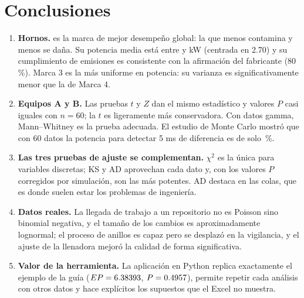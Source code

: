 \documentclass[11pt]{article}
\begin{document}
\section*{Conclusiones}
\begin{enumerate}
\item \textbf{Hornos.} \mejor{} es la marca de mejor desempeño global: la que menos contamina y menos se daña. Su
potencia media está entre \muLi{} y \muLs{} kW (centrada en 2.70) y su cumplimiento de emisiones es consistente con
la afirmación del fabricante (80\,\%). Marca 3 es la más uniforme en potencia: su varianza es significativamente
menor que la de Marca 4.
\item \textbf{Equipos A y B.} Las pruebas $t$ y $Z$ dan el mismo estadístico y valores $P$ casi iguales con $n=60$; la
$t$ es ligeramente más conservadora. Con datos gamma, Mann–Whitney es la prueba adecuada. El estudio de Monte Carlo
mostró que con 60 datos la potencia para detectar 5 ms de diferencia es de solo \mcTUno\,\%.
\item \textbf{Las tres pruebas de ajuste se complementan.} $\chi^2$ es la única para variables discretas; KS y AD
aprovechan cada dato y, con los valores $P$ corregidos por simulación, son las más potentes. AD destaca en las
colas, que es donde suelen estar los problemas de ingeniería.
\item \textbf{Datos reales.} La llegada de trabajo a un repositorio no es Poisson sino binomial negativa, y el tamaño
de los cambios es aproximadamente lognormal; el proceso de anillos es capaz pero se desplazó en la vigilancia, y el
ajuste de la llenadora mejoró la calidad de forma significativa.
\item \textbf{Valor de la herramienta.} La aplicación en Python replica exactamente el ejemplo de la guía
($EP=6.38393$, $P=0.4957$), permite repetir cada análisis con otros datos y hace explícitos los supuestos que
el Excel no muestra.
\end{enumerate}
\end{document}
